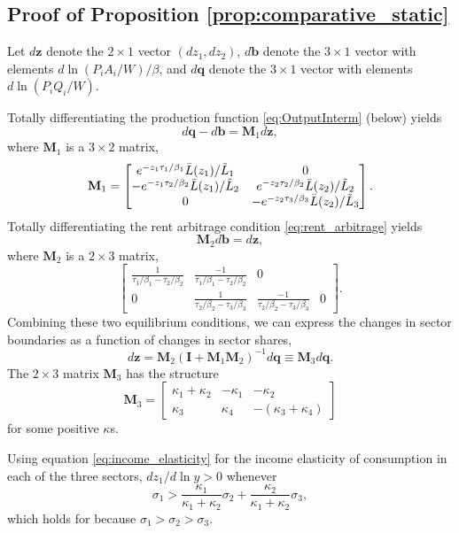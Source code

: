 \documentclass[12pt]{article}
\begin{document}
\subsection{Proof of Proposition \ref{prop:comparative_static}}
Let $d\mathbf z$ denote the $2\times1$ vector $(dz_1,dz_2)$, $d\mathbf b$ denote the $3\times1$ vector with elements $d\ln(P_iA_i/W)/\beta$, and $d\mathbf q$ denote the $3\times1$ vector with elements $d\ln(P_iQ_i/W)$.

Totally differentiating the production function \eqref{eq:OutputInterm} (below) yields
\[
d\mathbf q - d\mathbf b = \mathbf M_1 d\mathbf z,
\]
where $\mathbf M_1$ is a $3\times2$ matrix,
\[
\mathbf M_1 =
\begin{bmatrix}
	e^{-z_1\tau_1/\beta_1}\Bar L(z_1)/\tilde L_1 & 0\\
	-e^{-z_1\tau_2/\beta_2}\Bar L(z_1)/\tilde L_2 & 
		e^{-z_2\tau_2/\beta_2}\Bar L(z_2)/\tilde L_2\\
	0 & -e^{-z_2\tau_3/\beta_3}\Bar L(z_2)/\tilde L_3 
\end{bmatrix}.
\]
Totally differentiating the rent arbitrage condition \eqref{eq:rent_arbitrage} yields
\[
\mathbf M_2 d\mathbf b = d\mathbf z, 
\]
where $\mathbf M_2$ is a $2\times3$ matrix,
\[
\begin{bmatrix}
	\frac 1
		{\tau_1/\beta_1 - \tau_2/\beta_2}
	& 	\frac {-1}
		{\tau_1/\beta_1 - \tau_2/\beta_2}
	& 0 \\
	0
	& \frac 1
		{\tau_2/\beta_2 - \tau_3/\beta_3}
	& 	\frac {-1}
		{\tau_2/\beta_2 - \tau_3/\beta_3}
	& 0 
\end{bmatrix}.
\]
Combining these two equilibrium conditions, we can express the changes in sector boundaries as a function of changes in sector shares,
\[
d\mathbf z = \mathbf M_2 (\mathbf I+\mathbf M_1\mathbf M_2)^{-1}d\mathbf q \equiv \mathbf M_3 d\mathbf q.
\]
The $2\times3$ matrix $\mathbf M_3$ has the structure
\[
\mathbf M_3 =
\begin{bmatrix}
\kappa_1+\kappa_2 	& -\kappa_1 	& -\kappa_2 \\
\kappa_3 			& \kappa_4		& -(\kappa_3+\kappa_4)
\end{bmatrix}
\]
for some positive $\kappa$s. 

Using equation \eqref{eq:income_elasticity} for the income elasticity of consumption in each of the three sectors, $dz_1/d\ln y>0$ whenever 
\[
\sigma_1> \frac{\kappa_1}{\kappa_1+\kappa_2}\sigma_2 + \frac{\kappa_2}{\kappa_1+\kappa_2}\sigma_3, 
\]
which holds for because $\sigma_1>\sigma_2>\sigma_3$.
\end{document}
